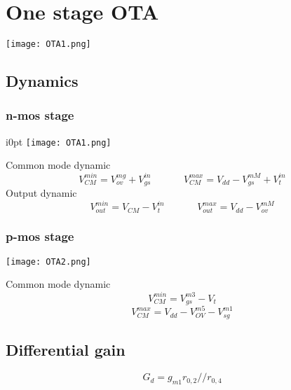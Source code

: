 \chapter{One stage OTA}

\centering
\texttt{[image: OTA1.png]}\\
\raggedright

\section{Dynamics}

\subsection{n-mos stage}

\begin{wrapfigure}{i}{0pt}
\texttt{[image: OTA1.png]}
\end{wrapfigure}

Common mode dynamic
\begin{equation}
V_{CM}^{min}=V_{ov}^{mg}+V_{gs}^{in}\ \ \ \ \ \ \ \ \ \ \ \ \ \ \ V_{CM}^{max}=V_{dd}-V_{gs}^{mM}+V_t^{in}
\end{equation}
Output dynamic 
\begin{equation}
V_{out}^{min}=V_{CM}-V_t^{in}\ \ \ \ \ \ \ \ \ \ \ \ \ \ \ V_{out}^{max}=V_{dd}-V_{ov}^{mM}
\end{equation}
\vspace{1mm}

\subsection{p-mos stage}

\centering
\texttt{[image: OTA2.png]}\\
\raggedright

Common mode dynamic
\begin{equation}
V_{CM}^{min}=V_{gs}^{m3}-V_t 
\end{equation}
\begin{equation}
V_{CM}^{max}=V_{dd}-V_{OV}^{m5}-V_{sg}^{m1}
\end{equation}

\section{Differential gain}
\begin{equation}
G_d=g_{m1}r_{0,2}//r_{0,4}
\end{equation}

